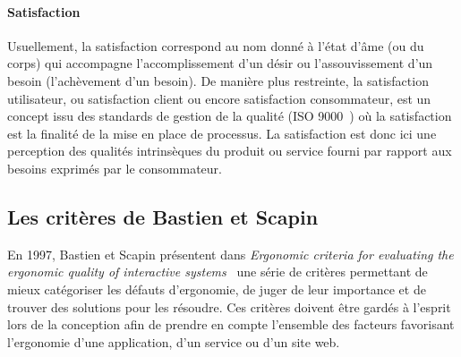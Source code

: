         \paragraph{Satisfaction}
            Usuellement, la satisfaction correspond au nom donné à l’état d’âme (ou du corps) qui accompagne l’accomplissement d'un désir ou l'assouvissement d'un besoin (l'achèvement d’un besoin). De manière plus restreinte, la satisfaction utilisateur, ou satisfaction client ou encore satisfaction consommateur, est un concept issu des standards de gestion de la qualité (ISO 9000~) où la satisfaction est la finalité de la mise en place de processus.
            La satisfaction est donc ici une perception des qualités intrinsèques du produit ou service fourni par rapport aux besoins exprimés par le consommateur.
    \subsection{Les critères de Bastien et Scapin}
        En 1997, Bastien et Scapin présentent dans \textit{Ergonomic criteria for evaluating the ergonomic quality of interactive systems}~\cite{scapin1997ergonomic} une série de critères permettant de mieux catégoriser les défauts d’ergonomie, de juger de leur importance et de trouver des solutions pour les résoudre. Ces critères doivent être gardés à l’esprit lors de la conception afin de prendre en compte l’ensemble des facteurs favorisant l’ergonomie d’une application, d’un service ou d’un site web.
